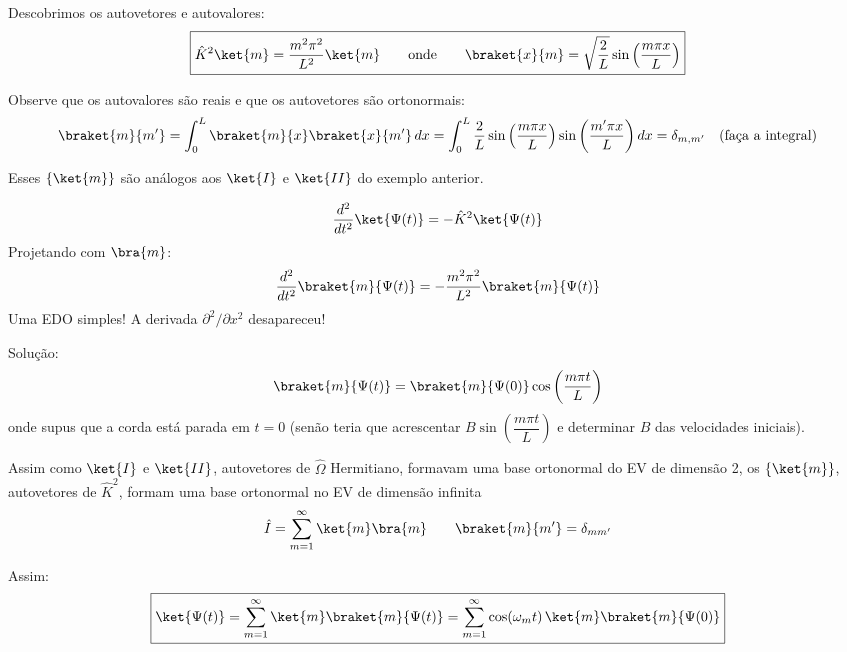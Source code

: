 Descobrimos os autovetores e autovalores:
\begin{equation}
\boxed{\hat{K}^2\ket{m} = \frac{m^2\pi^2}{L^2}\ket{m} \qquad \text{onde} \qquad \braket{x}{m} = \sqrt{\frac{2}{L}}\sin\left(\frac{m\pi x}{L}\right)}
\label{eq:aula7_K2_autovetores}
\end{equation}

Observe que os autovalores são reais e que os autovetores são ortonormais:
\begin{equation}
\braket{m}{m'} = \int_0^L \braket{m}{x}\braket{x}{m'}\,dx = \int_0^L \frac{2}{L}\sin\left(\frac{m\pi x}{L}\right)\sin\left(\frac{m'\pi x}{L}\right)dx = \delta_{m,m'} \quad \text{(faça a integral)}
\label{eq:aula7_K2_ortonormalidade}
\end{equation}

Esses $\{\ket{m}\}$ são análogos aos $\ket{I}$ e $\ket{II}$ do exemplo anterior.

\begin{equation}
\frac{d^2}{dt^2}\ket{\Psi(t)} = -\hat{K}^2\ket{\Psi(t)}
\label{eq:aula7_eq_temporal}
\end{equation}
Projetando com $\bra{m}$:
\begin{equation}
\frac{d^2}{dt^2}\braket{m}{\Psi(t)} = -\frac{m^2\pi^2}{L^2}\braket{m}{\Psi(t)}
\label{eq:aula7_eq_temporal_projetada}
\end{equation}
Uma EDO simples! A derivada $\partial^2/\partial x^2$ desapareceu!

Solução:
\begin{equation}
\braket{m}{\Psi(t)} = \braket{m}{\Psi(0)}\cos\left(\frac{m\pi t}{L}\right)
\label{eq:aula7_solucao_temporal}
\end{equation}
onde supus que a corda está parada em $t=0$ (senão teria que acrescentar $B\sin\!\left(\dfrac{m\pi t}{L}\right)$ e determinar $B$ das velocidades iniciais).

Assim como $\ket{I}$ e $\ket{II}$, autovetores de $\hat{\Omega}$ Hermitiano, formavam uma base ortonormal do EV de dimensão 2, os $\{\ket{m}\}$, autovetores de $\hat{K}^2$, formam uma base ortonormal no EV de dimensão infinita
\begin{equation}
\hat{I} = \sum_{m=1}^{\infty}\ket{m}\bra{m} \qquad \braket{m}{m'} = \delta_{mm'}
\label{eq:aula7_identidade_m}
\end{equation}

Assim:
\begin{equation}
\boxed{\ket{\Psi(t)} = \sum_{m=1}^{\infty}\ket{m}\braket{m}{\Psi(t)} = \sum_{m=1}^{\infty}\cos(\omega_m t)\,\ket{m}\braket{m}{\Psi(0)}}
\label{eq:aula7_psi_t}
\end{equation}

